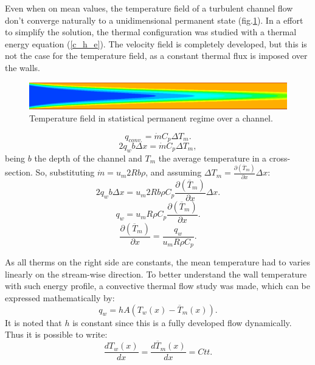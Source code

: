 \documentclass[10pt]{article} %
\begin{document}
Even when on mean values, the temperature field of a turbulent channel flow don't converge naturally to a unidimensional permanent state (fig.\ref{figure.2}). In a effort to simplify the solution, the thermal configuration was studied with a thermal energy equation (\ref{c_h_e}).
The velocity field is completely developed, but this is not the case for the temperature field, as a constant thermal flux is imposed over the walls.
\begin{figure}[h!]
	\centering
	\includegraphics[angle=0, scale=0.40]{temperatura}
	\caption{Temperature field in statistical permanent regime over a channel.}
	\label{figure.2}
\end{figure}
\begin{equation}\label{c_h_e}
q_{conv.} = \dot{m} C_p \Delta T_m.
\end{equation}
\begin{equation}
2q_w b \Delta x = \dot{m} C_p \Delta T_m,
\end{equation}
being $b$ the depth of the channel and $T_m$ the average temperature in a cross-section. So, substituting $ \dot{m} = u_m 2R b \rho $, and assuming $ \Delta T_m = \frac{\partial{\left(\overline{T}_m\right)}}{\partial{x}} \Delta x $:
\begin{equation}
2q_w b \Delta x = u_m 2R b \rho  C_p \frac{\partial{\left(\overline{T}_m\right)}}{\partial{x}} \Delta x.
\end{equation}     
\begin{equation}
q_w = u_m R \rho  C_p \frac{\partial{\left(\overline{T}_m\right)}}{\partial{x}} .
\end{equation} 
\begin{equation}\label{c_h_ee}
\frac{\partial{\left(\overline{T}_m\right)}}{\partial{x}} = \frac{q_w}{u_m  R \rho  C_p } .
\end{equation} 

As all therms on the right side are constants, the mean temperature had to varies linearly on the stream-wise direction.  
To better understand the wall temperature with such energy profile, a convective thermal flow study was made, which can be expressed mathematically by:
\begin{equation}
q_w = h A \left( T_w(x) - \overline{T}_m(x)\right).
\end{equation}
It is noted that $h$ is constant since this is a fully developed flow dynamically. Thus it is possible to write:
\begin{equation}
\frac{d T_w(x)}{d x} = \frac{d \overline{T}_m(x)}{d x} = Ctt.
\end{equation}	
\end{document}
